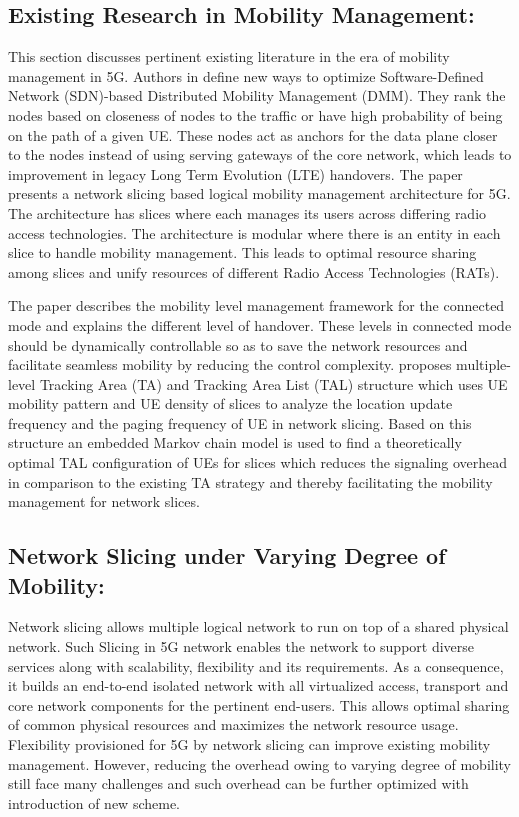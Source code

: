 \begin{multicols}{2}
\subsection{Existing Research in Mobility Management:}

This section discusses pertinent existing literature in the era of mobility management in 5G. Authors in \cite{art1-key03} define new ways to optimize Software-Defined Network (SDN)-based Distributed Mobility Management (DMM). They rank the nodes based on closeness of nodes to the traffic or have high probability of being on the path of a given UE. These nodes act as anchors for the data plane closer to the nodes instead of using serving gateways of the core network, which leads to  improvement in legacy Long Term Evolution (LTE) handovers.  The paper \cite{art1-key04} presents a network slicing based logical mobility management architecture for 5G. The architecture has slices where each manages its users across differing radio access technologies. The architecture is modular where there is an entity in each slice to handle mobility management. This leads to optimal resource sharing among slices and unify resources of different Radio Access Technologies (RATs).

The paper \cite{art1-key05} describes the mobility level management framework for the connected mode and explains the different level of handover. These levels in connected mode should be dynamically controllable so as to save the network resources and facilitate seamless mobility by reducing the control complexity.  \cite{art1-key06} proposes multiple-level Tracking Area (TA) and Tracking  Area List (TAL) structure which uses UE mobility pattern  and UE density of slices to analyze the location update  frequency and the paging frequency of UE in network slicing.  Based on this structure an embedded Markov chain model is used to find a theoretically optimal TAL configuration of UEs  for slices which reduces the signaling overhead in comparison  to the existing TA strategy and thereby facilitating the mobility  management for network slices.

\subsection{Network Slicing under Varying Degree of Mobility:}

Network slicing allows multiple logical network to run on top of a shared physical network. Such Slicing in 5G network enables the network to support diverse services along with scalability, flexibility and its requirements. As a consequence, it builds an end-to-end isolated network with all virtualized access, transport and core network components for the pertinent end-users. This allows optimal sharing of common physical resources and maximizes the network resource usage. Flexibility provisioned for 5G by network slicing can improve existing mobility management. However, reducing the overhead owing to varying degree of mobility still face many challenges and such overhead can be further optimized with introduction of new scheme.


\end{multicols}
